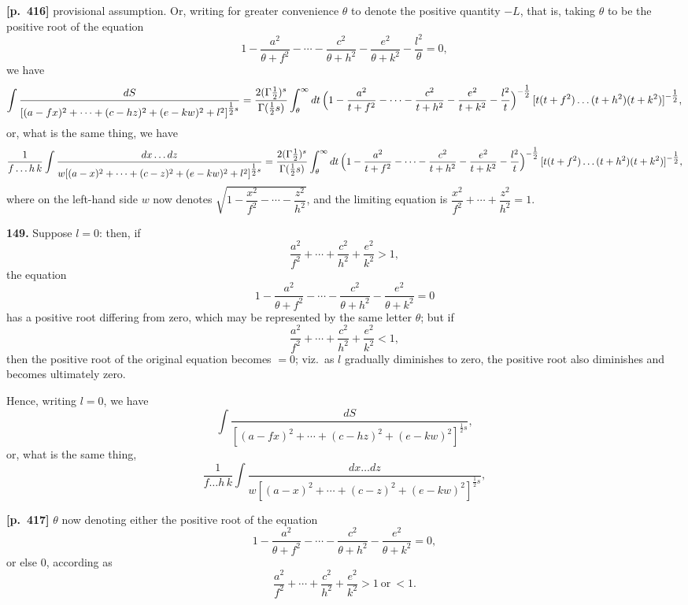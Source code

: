 \documentclass[11pt,a4paper]{article}
\begin{document}
\bigskip
\noindent\textbf{[p.~416]}\quad
provisional assumption. Or, writing for greater convenience $\theta$ to denote the positive quantity $-L$, that is, taking $\theta$ to be the positive root of the equation
\[
1 - \frac{a^{2}}{\theta+f^{2}} - \cdots - \frac{c^{2}}{\theta+h^{2}} - \frac{e^{2}}{\theta+k^{2}} - \frac{l^{2}}{\theta} = 0,
\]
we have
\[
\int \frac{dS}{[(a-fx)^{2}+\cdots+(c-hz)^{2}+(e-kw)^{2}+l^{2}]^{\tfrac{1}{2}s}} = \frac{2(\Gamma\tfrac{1}{2})^{s}}{\Gamma(\tfrac{1}{2}s)}\int_{\theta}^{\infty} dt\,\Bigl(1 - \frac{a^{2}}{t+f^{2}} - \cdots - \frac{c^{2}}{t+h^{2}} - \frac{e^{2}}{t+k^{2}} - \frac{l^{2}}{t}\Bigr)^{-\tfrac{1}{2}}\,[t(t+f^{2})\ldots(t+h^{2})(t+k^{2})]^{-\tfrac{1}{2}},
\]
or, what is the same thing, we have
\[
\frac{1}{f\ldots h\,k}\int \frac{dx\ldots dz}{w[(a-x)^{2}+\cdots+(c-z)^{2}+(e-kw)^{2}+l^{2}]^{\tfrac{1}{2}s}} = \frac{2(\Gamma\tfrac{1}{2})^{s}}{\Gamma(\tfrac{1}{2}s)}\int_{\theta}^{\infty} dt\,\Bigl(1 - \frac{a^{2}}{t+f^{2}} - \cdots - \frac{c^{2}}{t+h^{2}} - \frac{e^{2}}{t+k^{2}} - \frac{l^{2}}{t}\Bigr)^{-\tfrac{1}{2}}\,[t(t+f^{2})\ldots(t+h^{2})(t+k^{2})]^{-\tfrac{1}{2}},
\]
where on the left-hand side $w$ now denotes $\sqrt{1 - \dfrac{x^{2}}{f^{2}} - \cdots - \dfrac{z^{2}}{h^{2}}}$, and the limiting equation is $\dfrac{x^{2}}{f^{2}} + \cdots + \dfrac{z^{2}}{h^{2}} = 1$.

\textbf{149.} Suppose $l = 0$: then, if
\[
\frac{a^{2}}{f^{2}} + \cdots + \frac{c^{2}}{h^{2}} + \frac{e^{2}}{k^{2}} > 1,
\]
the equation
\[
1 - \frac{a^{2}}{\theta+f^{2}} - \cdots - \frac{c^{2}}{\theta+h^{2}} - \frac{e^{2}}{\theta+k^{2}} = 0
\]
has a positive root differing from zero, which may be represented by the same letter $\theta$; but if
\[
\frac{a^{2}}{f^{2}} + \cdots + \frac{c^{2}}{h^{2}} + \frac{e^{2}}{k^{2}} < 1,
\]
then the positive root of the original equation becomes $= 0$; viz.\ as $l$ gradually diminishes to zero, the positive root also diminishes and becomes ultimately zero.

Hence, writing $l = 0$, we have
\[
\int \frac{dS}{[(a-fx)^{2}+\cdots+(c-hz)^{2}+(e-kw)^{2}]^{\tfrac{1}{2}s}},
\]
or, what is the same thing,
\[
\frac{1}{f\ldots h\,k}\int \frac{dx\ldots dz}{w[(a-x)^{2}+\cdots+(c-z)^{2}+(e-kw)^{2}]^{\tfrac{1}{2}s}},
\]

\bigskip
\noindent\textbf{[p.~417]}\quad
$\theta$ now denoting either the positive root of the equation
\[
1 - \frac{a^{2}}{\theta+f^{2}} - \cdots - \frac{c^{2}}{\theta+h^{2}} - \frac{e^{2}}{\theta+k^{2}} = 0,
\]
or else $0$, according as
\[
\frac{a^{2}}{f^{2}} + \cdots + \frac{c^{2}}{h^{2}} + \frac{e^{2}}{k^{2}} > 1\ \text{or}\ < 1.
\]
\end{document}
